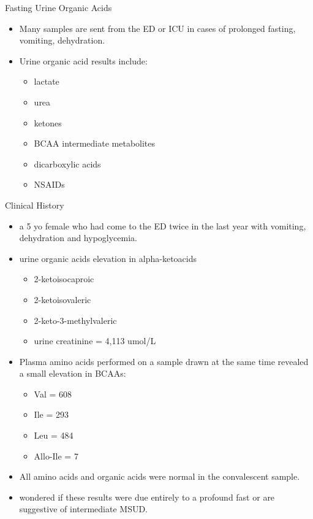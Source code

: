 \documentclass[presentation, smaller]{beamer}
\begin{document}
\begin{frame}[label={sec:orgheadline2}]{Fasting Urine Organic Acids}
\begin{itemize}
\item Many samples are sent from the ED or ICU in cases of prolonged
fasting, vomiting, dehydration.

\item Urine organic acid results include:
\begin{itemize}
\item lactate
\item urea
\item ketones
\item BCAA intermediate metabolites
\item dicarboxylic acids
\item NSAIDs
\end{itemize}
\end{itemize}
\end{frame}


\begin{frame}[label={sec:orgheadline3}]{Clinical History}
\begin{itemize}
\item a 5 yo female who had come to the ED twice in the last year with
vomiting, dehydration and hypoglycemia.

\item urine organic acids elevation in alpha-ketoacids 
\begin{itemize}
\item 2-ketoisocaproic
\item 2-ketoisovaleric
\item 2-keto-3-methylvaleric
\item urine creatinine = 4,113 umol/L
\end{itemize}

\item Plasma amino acids performed on a sample drawn at the same time
revealed a small elevation in BCAAs:
\begin{itemize}
\item Val = 608
\item Ile = 293
\item Leu = 484
\item Allo-Ile = 7
\end{itemize}

\item All amino acids and organic acids were normal in the convalescent
sample.

\item wondered if these results were due entirely to a profound fast or
are suggestive of intermediate MSUD.
\end{itemize}
\end{frame}
\end{document}
